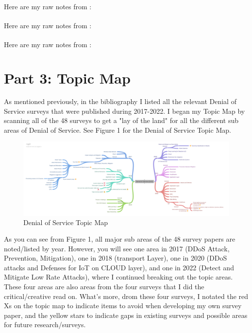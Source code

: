 \documentclass[a4paper]{article}
\begin{document}
Here are my raw notes from \cite{saif2018review}:\\
\\

Here are my raw notes from \cite{salim2020distributed}:\\
\\

Here are my raw notes from \cite{rios2022detection}:\\


\section{Part 3: Topic Map}
As mentioned previously, in the bibliography I listed all the relevant Denial of Service surveys that were published during 2017-2022. I began my Topic Map by scanning all of the 48 surveys to get a "lay of the land" for all the different sub areas of Denial of Service. See Figure 1 for the Denial of Service Topic Map.

\begin{figure}[H]
\centering
\includegraphics[width=1\textwidth]{Denial_of_Service_DoS.pdf}
\caption{\label{fig:DOS}Denial of Service Topic Map}
\end{figure}

 As you can see from Figure 1, all major sub areas of the 48 survey papers are noted/listed by year. However, you will see one area in 2017 (DDoS Attack, Prevention, Mitigation), one in 2018 (transport Layer), one in 2020 (DDoS attacks and Defenses for IoT on CLOUD layer), and one in 2022 (Detect and Mitigate Low Rate Attacks), where I continued breaking out the topic areas. These four areas are also areas from the four surveys that I did the critical/creative read on. What's more, drom these four surveys, I notated the red Xs on the topic map to indicate items to avoid when developing my own survey paper, and the yellow stars to indicate gaps in existing surveys and possible areas for future research/surveys.
\end{document}
